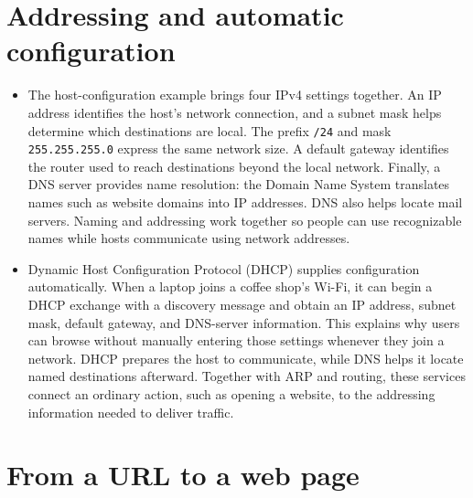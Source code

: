 \documentclass[10pt]{article}
\begin{document}
\section*{Addressing and automatic configuration}

\begin{itemize}[leftmargin=1.25em, itemsep=0.3em, parsep=0pt, topsep=0pt]
    \item The host-configuration example brings four IPv4 settings together. An IP address identifies the host's network connection, and a subnet mask helps determine which destinations are local. The prefix \texttt{/24} and mask \texttt{255.255.255.0} express the same network size. A default gateway identifies the router used to reach destinations beyond the local network. Finally, a DNS server provides name resolution: the Domain Name System translates names such as website domains into IP addresses. DNS also helps locate mail servers. Naming and addressing work together so people can use recognizable names while hosts communicate using network addresses.

    \item Dynamic Host Configuration Protocol (DHCP) supplies configuration automatically. When a laptop joins a coffee shop's Wi-Fi, it can begin a DHCP exchange with a discovery message and obtain an IP address, subnet mask, default gateway, and DNS-server information. This explains why users can browse without manually entering those settings whenever they join a network. DHCP prepares the host to communicate, while DNS helps it locate named destinations afterward. Together with ARP and routing, these services connect an ordinary action, such as opening a website, to the addressing information needed to deliver traffic.
\end{itemize}

\newpage
\section*{From a URL to a web page}
\end{document}

